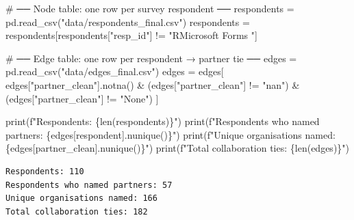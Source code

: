 \documentclass[
  letterpaper,
  DIV=11,
  numbers=noendperiod]{scrartcl}
\newenvironment{Shaded}{\begin{snugshade}}{\end{snugshade}}
\newcommand{\BuiltInTok}[1]{\textcolor[rgb]{0.00,0.23,0.31}{#1}}
\newcommand{\CommentTok}[1]{\textcolor[rgb]{0.37,0.37,0.37}{#1}}
\newcommand{\NormalTok}[1]{\textcolor[rgb]{0.00,0.23,0.31}{#1}}
\newcommand{\OperatorTok}[1]{\textcolor[rgb]{0.37,0.37,0.37}{#1}}
\newcommand{\SpecialCharTok}[1]{\textcolor[rgb]{0.37,0.37,0.37}{#1}}
\newcommand{\SpecialStringTok}[1]{\textcolor[rgb]{0.13,0.47,0.30}{#1}}
\newcommand{\StringTok}[1]{\textcolor[rgb]{0.13,0.47,0.30}{#1}}
\begin{document}
\label{import-data}
\begin{Shaded}
\begin{Highlighting}[]
\CommentTok{\# ── Node table: one row per survey respondent ──}
\NormalTok{respondents }\OperatorTok{=}\NormalTok{ pd.read\_csv(}\StringTok{"data/respondents\_final.csv"}\NormalTok{)}
\NormalTok{respondents }\OperatorTok{=}\NormalTok{ respondents[respondents[}\StringTok{"resp\_id"}\NormalTok{] }\OperatorTok{!=} \StringTok{"RMicrosoft Forms "}\NormalTok{]}

\CommentTok{\# ── Edge table: one row per respondent → partner tie ──}
\NormalTok{edges }\OperatorTok{=}\NormalTok{ pd.read\_csv(}\StringTok{"data/edges\_final.csv"}\NormalTok{)}
\NormalTok{edges }\OperatorTok{=}\NormalTok{ edges[}
\NormalTok{    edges[}\StringTok{"partner\_clean"}\NormalTok{].notna()}
    \OperatorTok{\&}\NormalTok{ (edges[}\StringTok{"partner\_clean"}\NormalTok{] }\OperatorTok{!=} \StringTok{"nan"}\NormalTok{)}
    \OperatorTok{\&}\NormalTok{ (edges[}\StringTok{"partner\_clean"}\NormalTok{] }\OperatorTok{!=} \StringTok{"None"}\NormalTok{)}
\NormalTok{]}
\end{Highlighting}
\end{Shaded}

\label{quick-summary}
\begin{Shaded}
\begin{Highlighting}[]
\BuiltInTok{print}\NormalTok{(}\SpecialStringTok{f"Respondents: }\SpecialCharTok{\{}\BuiltInTok{len}\NormalTok{(respondents)}\SpecialCharTok{\}}\SpecialStringTok{"}\NormalTok{)}
\BuiltInTok{print}\NormalTok{(}\SpecialStringTok{f"Respondents who named partners: }\SpecialCharTok{\{}\NormalTok{edges[}\StringTok{\textquotesingle{}respondent\textquotesingle{}}\NormalTok{]}\SpecialCharTok{.}\NormalTok{nunique()}\SpecialCharTok{\}}\SpecialStringTok{"}\NormalTok{)}
\BuiltInTok{print}\NormalTok{(}\SpecialStringTok{f"Unique organisations named: }\SpecialCharTok{\{}\NormalTok{edges[}\StringTok{\textquotesingle{}partner\_clean\textquotesingle{}}\NormalTok{]}\SpecialCharTok{.}\NormalTok{nunique()}\SpecialCharTok{\}}\SpecialStringTok{"}\NormalTok{)}
\BuiltInTok{print}\NormalTok{(}\SpecialStringTok{f"Total collaboration ties: }\SpecialCharTok{\{}\BuiltInTok{len}\NormalTok{(edges)}\SpecialCharTok{\}}\SpecialStringTok{"}\NormalTok{)}
\end{Highlighting}
\end{Shaded}

\begin{verbatim}
Respondents: 110
Respondents who named partners: 57
Unique organisations named: 166
Total collaboration ties: 182
\end{verbatim}
\end{document}
